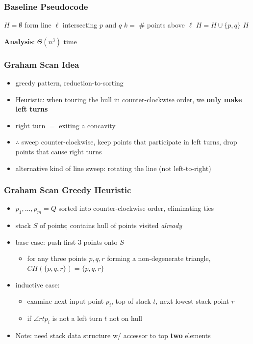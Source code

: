 \documentclass{beamer}
\begin{document}
\begin{frame} \frametitle{Baseline Pseudocode}
  {\small
\begin{algorithmic}[1]
    \State $H=\emptyset$
      \State form line $\ell$ intersecting $p$ and $q$
      \State $k = $ \# points above $\ell$
        \State $H = H \cup \{p, q\}$
      \EndIf
    \EndFor
    \State \Return $H$
  \EndFunction
\end{algorithmic}
}

\textbf{Analysis}: $\Theta(n^3)$ time
\end{frame}

\begin{frame} \frametitle{Graham Scan Idea}
\begin{itemize}
  \item greedy pattern, reduction-to-sorting
  \item Heuristic: when touring the hull in counter-clockwise order, we
    \textbf{only make left turns}
  \item right turn $=$ exiting a concavity
  \item $\therefore$ sweep counter-clockwise, keep points that participate in left
    turns, drop points that cause right turns
  \item alternative kind of line sweep: rotating the line (not left-to-right)
\end{itemize}
\end{frame}

\begin{frame} \frametitle{Graham Scan Greedy Heuristic}
\begin{itemize}
  \item $p_1, \ldots, p_m = Q$ sorted into counter-clockwise order, eliminating ties
  \item stack $S$ of points; contains hull of points visited \emph{already}
  \item base case: push first 3 points onto $S$
  \begin{itemize}
    \item for any three points $p, q, r$ forming a non-degenerate triangle,
      $CH(\{p, q, r\}) = \{p, q, r\}$
    \end{itemize}
  \item inductive case:
    \begin{itemize}
      \item examine next input point $p_i$, top of stack $t$, next-lowest stack point $r$
      \item if $\angle r t p_i$ is not a left turn $t$ not on hull
    \end{itemize}
  \item Note: need stack data structure w/ accessor to top \textbf{two} elements
  \end{itemize}
\end{frame}
\end{document}
